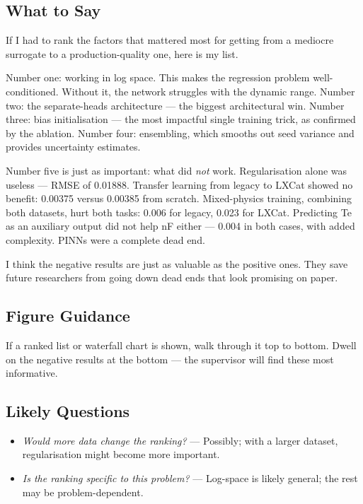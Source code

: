 \documentclass[12pt,a4paper]{article}
\begin{document}
\subsection*{What to Say}

If I had to rank the factors that mattered most for getting from a
mediocre surrogate to a production-quality one, here is my list.

Number one: working in log space. This makes the regression problem
well-conditioned. Without it, the network struggles with the dynamic
range. Number two: the separate-heads architecture --- the biggest
architectural win. Number three: bias initialisation --- the most
impactful single training trick, as confirmed by the ablation.
Number four: ensembling, which smooths out seed variance and provides
uncertainty estimates.

Number five is just as important: what did \emph{not} work.
Regularisation alone was useless --- RMSE of 0.01888. Transfer
learning from legacy to LXCat showed no benefit: 0.00375 versus
0.00385 from scratch. Mixed-physics training, combining both
datasets, hurt both tasks: 0.006 for legacy, 0.023 for LXCat.
Predicting Te as an auxiliary output did not help nF either --- 0.004
in both cases, with added complexity. PINNs were a complete dead end.

I think the negative results are just as valuable as the positive
ones. They save future researchers from going down dead ends that
look promising on paper.

\subsection*{Figure Guidance}
If a ranked list or waterfall chart is shown, walk through it top to
bottom. Dwell on the negative results at the bottom --- the
supervisor will find these most informative.

\subsection*{Likely Questions}
\begin{itemize}
  \item \emph{Would more data change the ranking?}
    --- Possibly; with a larger dataset, regularisation might become
    more important.
  \item \emph{Is the ranking specific to this problem?}
    --- Log-space is likely general; the rest may be
    problem-dependent.
\end{itemize}
\end{document}
